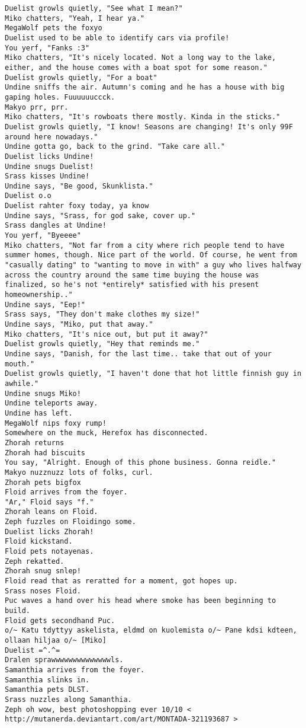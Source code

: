 \begin{verbatim}
Duelist growls quietly, "See what I mean?"
Miko chatters, "Yeah, I hear ya."
MegaWolf pets the foxyo
Duelist used to be able to identify cars via profile!
You yerf, "Fanks :3"
Miko chatters, "It's nicely located. Not a long way to the lake, either, and the house comes with a boat spot for some reason."
Duelist growls quietly, "For a boat"
Undine sniffs the air. Autumn's coming and he has a house with big gaping holes. Fuuuuuuccck.
Makyo prr, prr.
Miko chatters, "It's rowboats there mostly. Kinda in the sticks."
Duelist growls quietly, "I know! Seasons are changing! It's only 99F around here nowadays."
Undine gotta go, back to the grind. "Take care all."
Duelist licks Undine!
Undine snugs Duelist!
Srass kisses Undine!
Undine says, "Be good, Skunklista."
Duelist o.o
Duelist rahter foxy today, ya know
Undine says, "Srass, for god sake, cover up."
Srass dangles at Undine!
You yerf, "Byeeee"
Miko chatters, "Not far from a city where rich people tend to have summer homes, though. Nice part of the world. Of course, he went from "casually dating" to "wanting to move in with" a guy who lives halfway across the country around the same time buying the house was finalized, so he's not *entirely* satisfied with his present homeownership.."
Undine says, "Eep!"
Srass says, "They don't make clothes my size!"
Undine says, "Miko, put that away."
Miko chatters, "It's nice out, but put it away?"
Duelist growls quietly, "Hey that reminds me."
Undine says, "Danish, for the last time.. take that out of your mouth."
Duelist growls quietly, "I haven't done that hot little finnish guy in awhile."
Undine snugs Miko!
Undine teleports away.
Undine has left.
MegaWolf nips foxy rump!
Somewhere on the muck, Herefox has disconnected.
Zhorah returns
Zhorah had biscuits
You say, "Alright. Enough of this phone business. Gonna reidle."
Makyo nuzznuzz lots of folks, curl.
Zhorah pets bigfox
Floid arrives from the foyer.
"Ar," Floid says "f."
Zhorah leans on Floid.
Zeph fuzzles on Floidingo some.
Duelist licks Zhorah!
Floid kickstand.
Floid pets notayenas.
Zeph rekatted.
Zhorah snug snlep!
Floid read that as reratted for a moment, got hopes up.
Srass noses Floid.
Puc waves a hand over his head where smoke has been beginning to build.
Floid gets secondhand Puc.
o/~ Katu tdyttyy askelista, eldmd on kuolemista o/~ Pane kdsi kdteen, ollaan hiljaa o/~ [Miko]
Duelist =^.^=
Dralen sprawwwwwwwwwwwwwwls.
Samanthia arrives from the foyer.
Samanthia slinks in.
Samanthia pets DLST.
Srass nuzzles along Samanthia.
Zeph oh wow, best photoshopping ever 10/10 < http://mutanerda.deviantart.com/art/MONTADA-321193687 >

\end{verbatim}
